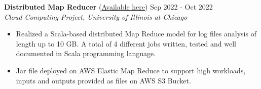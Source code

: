 \noindent
\textbf{Distributed Map Reducer} (\href{https://github.com/GiuseppeCalderonio/CS441_Homework1}{Available here}) \hfill Sep 2022 - Oct 2022 \\
\textit{Cloud Computing Project, University of Illinois at Chicago}
\begin{itemize}[noitemsep,topsep=0pt]
    \item Realized a Scala-based distributed Map Reduce model for log files analysis of length up to 10 GB. A total of 4 different jobs written, tested and well documented in Scala programming language. 
    \item Jar file deployed on AWS Elastic Map Reduce to support high workloads, inputs and outputs provided as files on AWS S3 Bucket.
\end{itemize}

\vspace{4pt}

